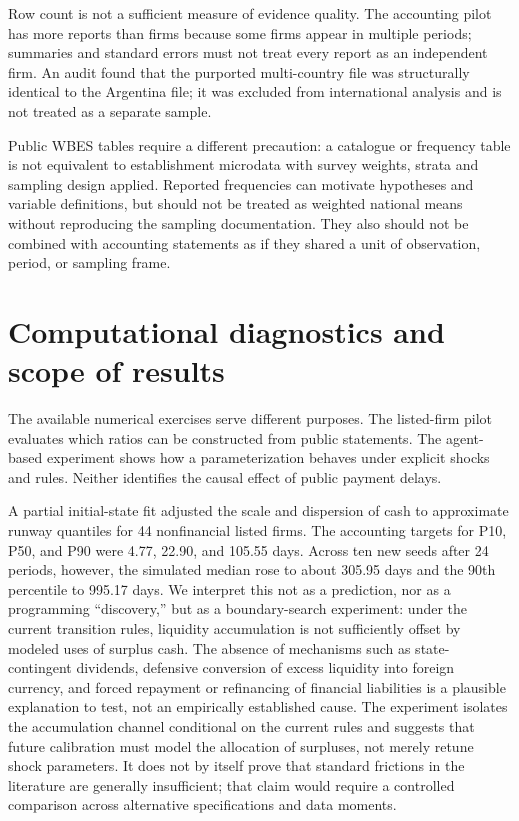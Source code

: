 \documentclass[11pt,a4paper]{article}
\begin{document}
Row count is not a sufficient measure of evidence quality. The accounting pilot has more reports than firms because some firms appear in multiple periods; summaries and standard errors must not treat every report as an independent firm. An audit found that the purported multi-country file was structurally identical to the Argentina file; it was excluded from international analysis and is not treated as a separate sample.

Public WBES tables require a different precaution: a catalogue or frequency table is not equivalent to establishment microdata with survey weights, strata and sampling design applied. Reported frequencies can motivate hypotheses and variable definitions, but should not be treated as weighted national means without reproducing the sampling documentation. They also should not be combined with accounting statements as if they shared a unit of observation, period, or sampling frame.

\section{Computational diagnostics and scope of results}
The available numerical exercises serve different purposes. The listed-firm pilot evaluates which ratios can be constructed from public statements. The agent-based experiment shows how a parameterization behaves under explicit shocks and rules. Neither identifies the causal effect of public payment delays.

A partial initial-state fit adjusted the scale and dispersion of cash to approximate runway quantiles for 44 nonfinancial listed firms. The accounting targets for P10, P50, and P90 were 4.77, 22.90, and 105.55 days. Across ten new seeds after 24 periods, however, the simulated median rose to about 305.95 days and the 90th percentile to 995.17 days. We interpret this not as a prediction, nor as a programming “discovery,” but as a boundary-search experiment: under the current transition rules, liquidity accumulation is not sufficiently offset by modeled uses of surplus cash. The absence of mechanisms such as state-contingent dividends, defensive conversion of excess liquidity into foreign currency, and forced repayment or refinancing of financial liabilities is a plausible explanation to test, not an empirically established cause. The experiment isolates the accumulation channel conditional on the current rules and suggests that future calibration must model the allocation of surpluses, not merely retune shock parameters. It does not by itself prove that standard frictions in the literature are generally insufficient; that claim would require a controlled comparison across alternative specifications and data moments.
\end{document}
